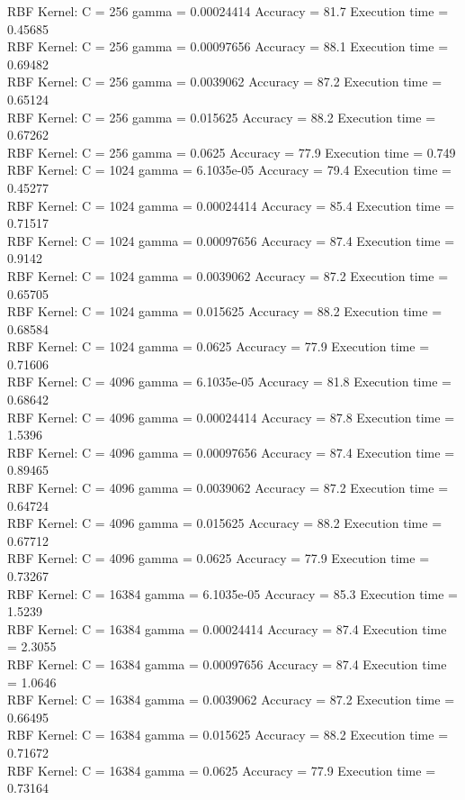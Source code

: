\documentclass[paper=a4, fontsize=11pt]{scrartcl} %
\numberwithin{equation}{section} %
\numberwithin{figure}{section} %
\numberwithin{table}{section} %
\begin{document}
RBF Kernel: C = 256 gamma = 0.00024414 Accuracy = 81.7 Execution time = 0.45685\\
RBF Kernel: C = 256 gamma = 0.00097656 Accuracy = 88.1 Execution time = 0.69482\\
RBF Kernel: C = 256 gamma = 0.0039062 Accuracy = 87.2 Execution time = 0.65124\\
RBF Kernel: C = 256 gamma = 0.015625 Accuracy = 88.2 Execution time = 0.67262\\
RBF Kernel: C = 256 gamma = 0.0625 Accuracy = 77.9 Execution time = 0.749\\
RBF Kernel: C = 1024 gamma = 6.1035e-05 Accuracy = 79.4 Execution time = 0.45277\\
RBF Kernel: C = 1024 gamma = 0.00024414 Accuracy = 85.4 Execution time = 0.71517\\
RBF Kernel: C = 1024 gamma = 0.00097656 Accuracy = 87.4 Execution time = 0.9142\\
RBF Kernel: C = 1024 gamma = 0.0039062 Accuracy = 87.2 Execution time = 0.65705\\
RBF Kernel: C = 1024 gamma = 0.015625 Accuracy = 88.2 Execution time = 0.68584\\
RBF Kernel: C = 1024 gamma = 0.0625 Accuracy = 77.9 Execution time = 0.71606\\
RBF Kernel: C = 4096 gamma = 6.1035e-05 Accuracy = 81.8 Execution time = 0.68642\\
RBF Kernel: C = 4096 gamma = 0.00024414 Accuracy = 87.8 Execution time = 1.5396\\
RBF Kernel: C = 4096 gamma = 0.00097656 Accuracy = 87.4 Execution time = 0.89465\\
RBF Kernel: C = 4096 gamma = 0.0039062 Accuracy = 87.2 Execution time = 0.64724\\
RBF Kernel: C = 4096 gamma = 0.015625 Accuracy = 88.2 Execution time = 0.67712\\
RBF Kernel: C = 4096 gamma = 0.0625 Accuracy = 77.9 Execution time = 0.73267\\
RBF Kernel: C = 16384 gamma = 6.1035e-05 Accuracy = 85.3 Execution time = 1.5239\\
RBF Kernel: C = 16384 gamma = 0.00024414 Accuracy = 87.4 Execution time = 2.3055\\
RBF Kernel: C = 16384 gamma = 0.00097656 Accuracy = 87.4 Execution time = 1.0646\\
RBF Kernel: C = 16384 gamma = 0.0039062 Accuracy = 87.2 Execution time = 0.66495\\
RBF Kernel: C = 16384 gamma = 0.015625 Accuracy = 88.2 Execution time = 0.71672\\
RBF Kernel: C = 16384 gamma = 0.0625 Accuracy = 77.9 Execution time = 0.73164\\\\
\end{document}
